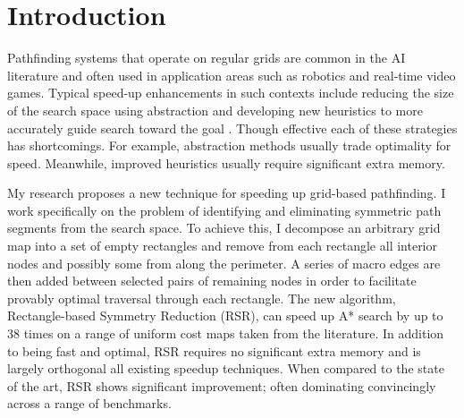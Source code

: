 \section{Introduction}
\label{sec:introduction}
Pathfinding systems that operate on regular grids are common in the AI
literature and often used in application areas such as robotics and real-time
video games.  Typical speed-up enhancements in such contexts include reducing
the size of the search space using abstraction \cite{botea04} and developing new
heuristics to more accurately guide search toward the goal \cite{sturtevant09}.
Though effective each of these strategies has shortcomings.  For example,
abstraction methods usually trade optimality for speed.  Meanwhile, improved
heuristics usually require significant extra memory.
\par 
My research proposes a new technique for speeding up grid-based pathfinding.  I
work specifically on the problem of identifying and eliminating symmetric path
segments from the search space.  To achieve this, I decompose an arbitrary grid
map into a set of empty rectangles and remove from each rectangle all interior
nodes and possibly some from along the perimeter.  A series of macro edges are
then added between selected pairs of remaining nodes in order to facilitate
provably optimal traversal through each rectangle.  The new algorithm,
Rectangle-based Symmetry Reduction (RSR), can speed up A* search by up to 38
times on a range of uniform cost maps taken from the literature.  In addition to
being fast and optimal, RSR requires no significant extra memory and is largely
orthogonal all existing speedup techniques.  When compared to the state of the
art, RSR shows significant improvement; often dominating convincingly across a
range of benchmarks.
